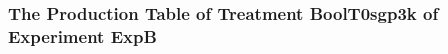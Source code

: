 \begin{frame}
 \fontsize{8pt}{9pt}\selectfont
 \frametitle{ The Production Table of Treatment BoolT0sgp3k of Experiment ExpB }

 \label{ExpBGrammarTable001.tex}  
 \end{frame}


